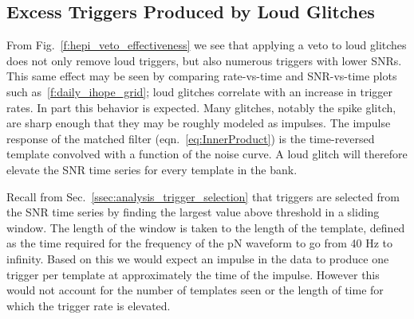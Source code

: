 \subsection{Excess Triggers Produced by Loud Glitches}
\label{ssec:penguins}

From Fig.~\ref{f:hepi_veto_effectiveness} we see that applying a
veto to loud glitches does not only remove loud triggers, but also
numerous triggers with lower SNRs.  This same effect may be seen by
comparing rate-vs-time and SNR-vs-time plots such
as~\ref{f:daily_ihope_grid}; loud glitches correlate with an increase
in trigger rates.  In part this behavior is expected.  Many glitches,
notably the spike glitch, are sharp enough that they may be roughly
modeled as impulses.  The impulse response of the matched filter
(eqn.~\ref{eq:InnerProduct}) is the time-reversed template convolved
with a function of the noise curve.  A loud glitch will therefore
elevate the SNR time series for every template in the bank.

Recall from Sec.~\ref{ssec:analysis_trigger_selection} that
triggers are selected from the SNR time series by finding the largest
value above threshold in a sliding window.  The length of the window
is taken to the length of the template, defined as the time required
for the frequency of the pN waveform to go from 40 Hz to infinity.
Based on this we would expect an impulse in the data to produce one
trigger per template at approximately the time of the impulse.
However this would not account for the number of templates seen or the
length of time for which the trigger rate is elevated. 


